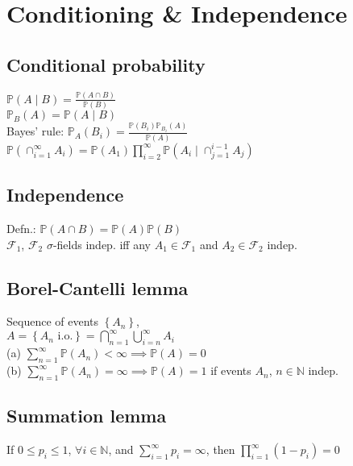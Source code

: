 \section{Conditioning \& Independence}

	\subsection*{Conditional probability}
	$\mathbb{P}\left(A\mid B\right) = \frac{\mathbb{P}\left(A\cap B\right)}{\mathbb{P}\left(B\right)}$\\
	$\mathbb{P}_{B}\left(A\right) = \mathbb{P}\left(A\mid B\right)$\\
	Bayes' rule: $\mathbb{P}_{A}\left(B_{i}\right) = \frac{\mathbb{P}\left(B_{i}\right)\mathbb{P}_{B_{i}}\left(A\right)}{\mathbb{P}\left(A\right)}$\\
	$\mathbb{P}\left(\cap_{i = 1}^{\infty}A_{i}\right) = \mathbb{P}\left(A_{1}\right)\prod_{i = 2}^{\infty}\mathbb{P}\left(A_{i}\mid\cap_{j = 1}^{i - 1}A_{j}\right)$
	
	\subsection*{Independence}
	Defn.: $\mathbb{P}\left(A\cap B\right) = \mathbb{P}\left(A\right)\mathbb{P}\left(B\right)$\\
	$\mathcal{F}_{1}$, $\mathcal{F}_{2}$ $\sigma$-fields indep. iff any $A_{1}\in\mathcal{F}_{1}$ and $A_{2}\in\mathcal{F}_{2}$ indep.
	
	\subsection*{Borel-Cantelli lemma}
	Sequence of events $\left\{A_{n}\right\}$,\\
	$A = \left\{A_{n}\text{ i.o.}\right\} = \bigcap_{n = 1}^{\infty}\bigcup_{i=n}^{\infty}A_{i}$\\
	(a) $\sum_{n = 1}^{\infty}\mathbb{P}\left(A_{n}\right) < \infty\implies\mathbb{P}\left(A\right) = 0$\\
	(b) $\sum_{n = 1}^{\infty}\mathbb{P}\left(A_{n}\right) = \infty\implies\mathbb{P}\left(A\right) = 1$ if events $A_{n}$, $n\in\mathbb{N}$ indep.
	
	\subsection*{Summation lemma}
	If $0\leq p_{i}\leq 1$, $\forall i\in\mathbb{N}$, and $\sum_{i = 1}^{\infty}p_{i} = \infty$, then $\prod_{i = 1}^{\infty}\left(1 - p_{i}\right) = 0$
	